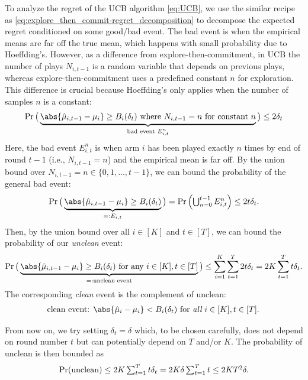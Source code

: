 To analyze the regret of the UCB algorithm \eqref{eq:UCB}, we use the similar recipe as \eqref{eq:explore_then_commit-regret_decomposition} to decompose the expected regret conditioned on some good/bad event.
The bad event is when the empirical means are far off the true mean, which happens with small probability due to Hoeffding's.
However, as a difference from explore-then-commitment, in UCB the number of plays $N_{i,t-1}$ is a random variable that depends on previous plays, whereas explore-then-commitment uses a predefined constant $n$ for exploration.
This difference is crucial because Hoeffding's only applies when the number of samples $n$ is a constant:
\begin{align*}
    \Pr\big(\underbrace{\abs{\hat{\mu}_{i, t-1}-\mu_i} \geq B_i(\delta_t) \text { where $N_{i, t-1}=n$ for constant $n$}}_{\text{bad event $E_{i,t}^n$}}\big) \leq 2 \delta_t
\end{align*}
Here, the bad event $E_{i,t}^n$ is when arm $i$ has been played exactly $n$ times by end of round $t-1$ (i.e., $N_{i, t-1}=n$) and the empirical mean is far off.
By the union bound over $N_{i, t-1}=n\in\{0,1,\ldots,t-1\}$, we can bound the probability of the general bad event:
\begin{align*}
    \Pr\big(\underbrace{\abs{\hat{\mu}_{i, t-1}-\mu_i} \geq B_i(\delta_t)}_{=:E_{i,t}} \big) = \Pr\left(\textstyle\bigcup_{n=0}^{t-1}E_{i,t}^n \right)\leq 2t\delta_t
    .
\end{align*}
Then, by the union bound over all $i\in[K]$ and $t\in[T]$, we can bound the probability of our {\em unclean} event:
\begin{align*}
    \Pr\big(\underbrace{\abs{\hat{\mu}_{i, t-1}-\mu_i} \geq B_i(\delta_t) \text{ for any } i\in[K], t\in[T]}_{=:\text{unclean event}} \big) \leq \sum_{i=1}^{K}\sum_{t=1}^{T}2t\delta_t = 2K \sum_{t=1}^{T}t\delta_t
    .
\end{align*}
The corresponding {\em clean} event is the complement of unclean:
\begin{align*}
\text{
clean event: $\abs{\hat{\mu}_i-\mu_i} < B_i(\delta_t)$ for {\em all} $i\in[K], t\in[T]$. 
}    
\end{align*}

From now on, we try setting $\delta_t=\delta$ which, to be chosen carefully, does not depend on round number $t$ but can potentially depend on $T$ and/or $K$.
The probability of unclean is then bounded as
\begin{align*}
    \Pr({\rm unclean}) \leq 2K \textstyle\sum_{t=1}^{T}t\delta_t = 2K\delta \sum_{t=1}^{T}t \leq 2KT^2\delta
    .
\end{align*}

